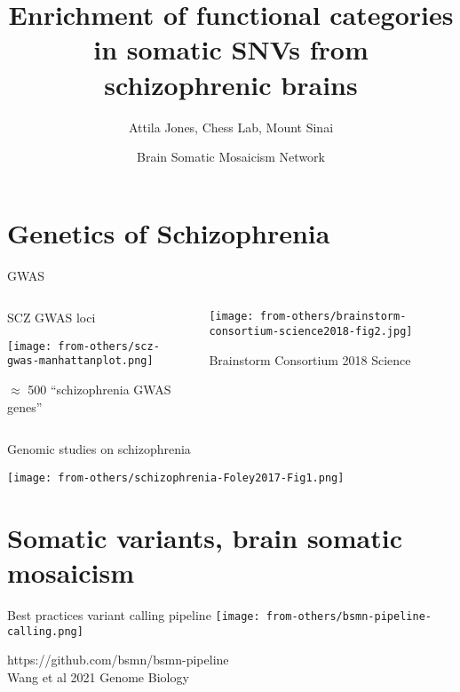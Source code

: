 \documentclass[usenames,dvipsnames]{beamer}
\title{Enrichment of functional categories in somatic SNVs from schizophrenic
brains}
\author{Attila Jones, Chess Lab, Mount Sinai}
\date{Brain Somatic Mosaicism Network}
\begin{document}
\maketitle

\section{Genetics of Schizophrenia}

\begin{frame}{GWAS}

\begin{columns}[t]
\begin{column}{0.5\textwidth}
\begin{center}
SCZ GWAS loci

\texttt{[image: from-others/scz-gwas-manhattanplot.png]}

\footnotesize
\(\approx\) 500 ``schizophrenia GWAS genes''
\end{center}
\end{column}

\begin{column}{0.5\textwidth}

\texttt{[image: from-others/brainstorm-consortium-science2018-fig2.jpg]}

{\tiny Brainstorm Consortium 2018 Science}
\end{column}
\end{columns}
\end{frame}

\begin{frame}{Genomic studies on schizophrenia}
\begin{center}
\texttt{[image: from-others/schizophrenia-Foley2017-Fig1.png]}
\end{center}
\end{frame}

\section{Somatic variants, brain somatic mosaicism}

\begin{frame}{Best practices variant calling pipeline}
\texttt{[image: from-others/bsmn-pipeline-calling.png]}

{\tiny https://github.com/bsmn/bsmn-pipeline \\
	Wang et al 2021 Genome Biology}
\end{frame}
\end{document}
